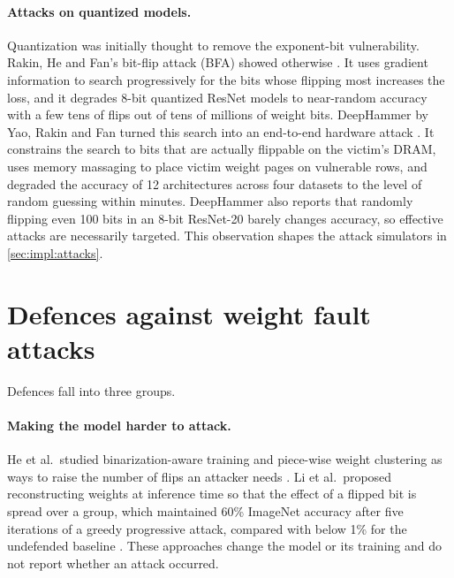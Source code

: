\paragraph{Attacks on quantized models.} Quantization was initially thought to remove the
exponent-bit vulnerability. Rakin, He and Fan's bit-flip attack (BFA) showed otherwise
\cite{rakin2019bfa}. It uses gradient information to search progressively for the bits whose
flipping most increases the loss, and it degrades 8-bit quantized ResNet models to near-random
accuracy with a few tens of flips out of tens of millions of weight bits. DeepHammer by Yao,
Rakin and Fan turned this search into an end-to-end hardware attack \cite{yao2020deephammer}.
It constrains the search to bits that are actually flippable on the victim's DRAM, uses memory
massaging to place victim weight pages on vulnerable rows, and degraded the accuracy of 12
architectures across four datasets to the level of random guessing within minutes. DeepHammer
also reports that randomly flipping even 100 bits in an 8-bit ResNet-20 barely changes accuracy,
so effective attacks are necessarily targeted. This observation shapes the attack simulators in
\cref{sec:impl:attacks}.

\section{Defences against weight fault attacks}
\label{sec:rw:bfadef}

Defences fall into three groups.

\paragraph{Making the model harder to attack.} He et al.\ studied binarization-aware training
and piece-wise weight clustering as ways to raise the number of flips an attacker needs
\cite{he2020defending}. Li et al.\ proposed reconstructing weights at inference time so that the
effect of a flipped bit is spread over a group, which maintained 60\% ImageNet accuracy after
five iterations of a greedy progressive attack, compared with below 1\% for the undefended
baseline \cite{li2020defending}. These approaches change the model or its training and do not
report whether an attack occurred.

